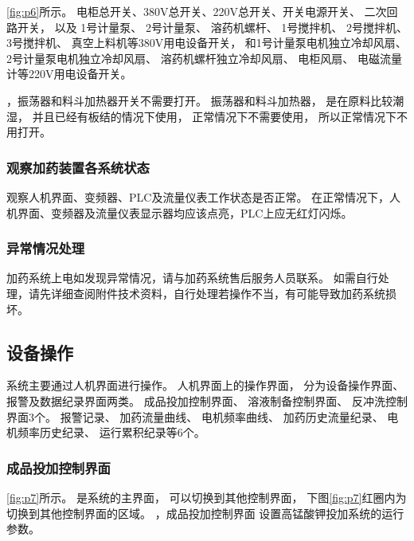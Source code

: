 \documentclass[UTF8,a4paper,12pt,titlepage]{ctexart}
\begin{document}
      \ref*{fig:p6}所示。
      电柜总开关、380V总开关、220V总开关、开关电源开关、
      二次回路开关，
      以及
      1号计量泵、
      2号计量泵、
      溶药机螺杆、
      1号搅拌机、
      2号搅拌机、
      3号搅拌机、
      真空上料机等380V用电设备开关，
      和1号计量泵电机独立冷却风扇、
      2号计量泵电机独立冷却风扇、
      溶药机螺杆独立冷却风扇、
      电柜风扇、
      电磁流量计等220V用电设备开关。

      ，振荡器和料斗加热器开关不需要打开。
      振荡器和料斗加热器，
      是在原料比较潮湿，
      并且已经有板结的情况下使用，
      正常情况下不需要使用，
      所以正常情况下不用打开。

      \subsubsection{观察加药装置各系统状态}
      观察人机界面、变频器、PLC及流量仪表工作状态是否正常。
      在正常情况下，人机界面、变频器及流量仪表显示器均应该点亮，PLC上应无红灯闪烁。

      \subsubsection{异常情况处理}
      加药系统上电如发现异常情况，请与加药系统售后服务人员联系。
      如需自行处理，请先详细查阅附件技术资料，自行处理若操作不当，有可能导致加药系统损坏。

         \newpage %

   \subsection{设备操作}\label{sec:s1}
      系统主要通过人机界面进行操作。
         人机界面上的操作界面，
         分为设备操作界面、报警及数据纪录界面两类。
         成品投加控制界面、
         溶液制备控制界面、
         反冲洗控制界面3个。
         报警记录、
         加药流量曲线、
         电机频率曲线、
         加药历史流量纪录、
         电机频率历史纪录、
         运行累积纪录等6个。

         \subsubsection{成品投加控制界面}

            \ref{fig:p7}所示。
            是系统的主界面，
            可以切换到其他控制界面，
            下图\ref{fig:p7}红圈内为切换到其他控制界面的区域。
            ，成品投加控制界面
            设置高锰酸钾投加系统的运行参数。
\end{document}
